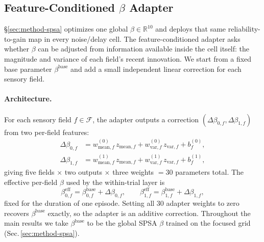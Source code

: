 \documentclass[sn-mathphys,NameDate,iicol]{sn-jnl}
\begin{document}
\subsection{Feature-Conditioned $\beta$ Adapter}
\label{sec:method-fc}
\label{sec:method-feature-cond}

\S\ref{sec:method-spsa} optimizes one global
$\beta\!\in\!\mathbb{R}^{10}$ and deploys that same reliability-to-gain
map in every noise/delay cell. The feature-conditioned adapter asks
whether $\beta$ can be adjusted from information available inside the
cell itself: the magnitude and variance of each field's recent
innovation. We start from a fixed base parameter
$\beta^{\mathrm{base}}$ and add a small independent linear correction
for each sensory field.

\paragraph{Architecture.}
For each sensory field $f \!\in\! \mathcal{F}$, the adapter outputs a
correction $(\Delta\beta_{0,f}, \Delta\beta_{1,f})$ from two
per-field features:
\begin{equation}
\begin{aligned}
\Delta\beta_{0,f}
 &= w^{(0)}_{\mathrm{mean},f} \, z_{\mathrm{mean},f}
 + w^{(0)}_{\mathrm{var},f} \, z_{\mathrm{var},f}
 + b^{(0)}_f, \\
\Delta\beta_{1,f}
 &= w^{(1)}_{\mathrm{mean},f} \, z_{\mathrm{mean},f}
 + w^{(1)}_{\mathrm{var},f} \, z_{\mathrm{var},f}
 + b^{(1)}_f,
\end{aligned}
\label{eq:feature_cond_adapter}
\end{equation}
giving five fields $\times$ two outputs $\times$ three weights
$=30$ parameters total. The effective per-field $\beta$ used by the
within-trial layer is
\begin{equation}
\beta_{0,f}^{\mathrm{eff}} = \beta_{0,f}^{\mathrm{base}}
 + \Delta\beta_{0,f},
\qquad
\beta_{1,f}^{\mathrm{eff}} = \beta_{1,f}^{\mathrm{base}}
 + \Delta\beta_{1,f},
\label{eq:feature_cond_beta}
\end{equation}
fixed for the duration of one episode. Setting all 30 adapter
weights to zero recovers $\beta^{\mathrm{base}}$ exactly, so the
adapter is an additive correction. Throughout the main results we
take $\beta^{\mathrm{base}}$ to be the global SPSA $\beta$ trained
on the focused grid (Sec.\,\ref{sec:method-spsa}).
\end{document}
